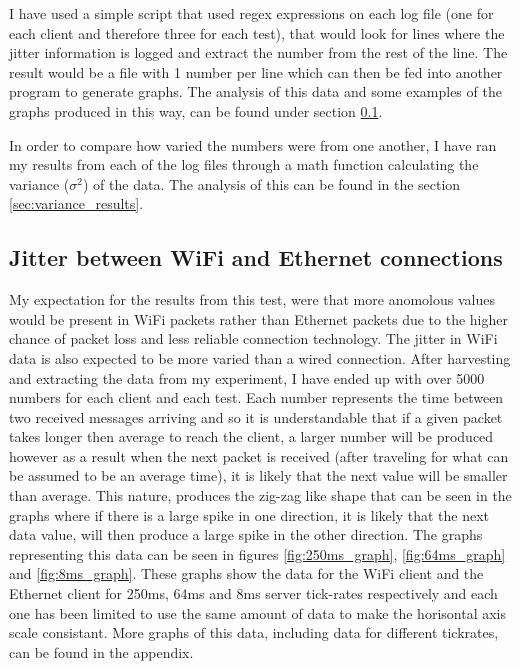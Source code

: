 I have used a simple script that used regex expressions on each log file (one for each client and therefore three for each test), that would look for lines where the jitter information is logged and extract the number from the rest of the line. The result would be a file with 1 number per line which can then be fed into another program to generate graphs. The analysis of this data and some examples of the graphs produced in this way, can be found under section \ref{sec:jitter_results}.

In order to compare how varied the numbers were from one another, I have ran my results from each of the log files through a math function calculating the variance ($\sigma^2$) of the data. The analysis of this can be found in the section \ref{sec:variance_results}.

\newpage
\subsection{Jitter between WiFi and Ethernet connections} \label{sec:jitter_results}
My expectation for the results from this test, were that more anomolous values would be present in WiFi packets rather than Ethernet packets due to the higher chance of packet loss and less reliable connection technology. The jitter in WiFi data is also expected to be more varied than a wired connection.
After harvesting and extracting the data from my experiment, I have ended up with over 5000 numbers for each client and each test. Each number represents the time between two received messages arriving and so it is understandable that if a given packet takes longer then average to reach the client, a larger number will be produced however as a result when the next packet is received (after traveling for what can be assumed to be an average time), it is likely that the next value will be smaller than average. This nature, produces the zig-zag like shape that can be seen in the graphs where if there is a large spike in one direction, it is likely that the next data value, will then produce a large spike in the other direction. The graphs representing this data can be seen in figures \ref{fig:250ms_graph}, \ref{fig:64ms_graph} and \ref{fig:8ms_graph}. These graphs show the data for the WiFi client and the Ethernet client for 250ms, 64ms and 8ms server tick-rates respectively and each one has been limited to use the same amount of data to make the horisontal axis scale consistant. More graphs of this data, including data for different tickrates, can be found in the appendix.

